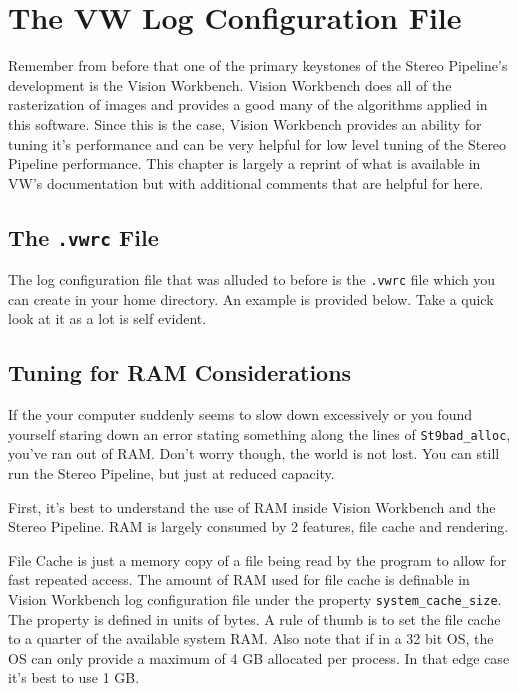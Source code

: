 \chapter{The VW Log Configuration File}
\label{ch:vwlogconfig}

Remember from before that one of the primary keystones of the Stereo
Pipeline's development is the Vision Workbench. Vision Workbench does
all of the rasterization of images and provides a good many of the
algorithms applied in this software. Since this is the case, Vision
Workbench provides an ability for tuning it's performance and can be
very helpful for low level tuning of the Stereo Pipeline
performance. This chapter is largely a reprint of what is available in
VW's documentation but with additional comments that are helpful for
here.

\section {The {\tt.vwrc} File}

The log configuration file that was alluded to before is the
\verb#.vwrc# file which you can create in your home directory. An
example is provided below. Take a quick look at it as a lot is self
evident.

\begin{minipage}{0.94\linewidth}
\small{}
\end{minipage}

\section {Tuning for RAM Considerations}

If the your computer suddenly seems to slow down excessively or you
found yourself staring down an error stating something along the lines
of \verb#St9bad_alloc#, you've ran out of RAM. Don't worry though, the
world is not lost. You can still run the Stereo Pipeline, but just at reduced capacity.

First, it's best to understand the use of RAM inside Vision Workbench
and the Stereo Pipeline. RAM is largely consumed by 2 features, file
cache and rendering.

File Cache is just a memory copy of a file being
read by the program to allow for fast repeated access. The amount of
RAM used for file cache is definable in Vision Workbench log
configuration file under the property \verb#system_cache_size#. The
property is defined in units of bytes. A rule of thumb is to set the
file cache to a quarter of the available system RAM. Also note that if
in a 32 bit OS, the OS can only provide a maximum of 4 GB allocated
per process. In that edge case it's best to use 1 GB.

